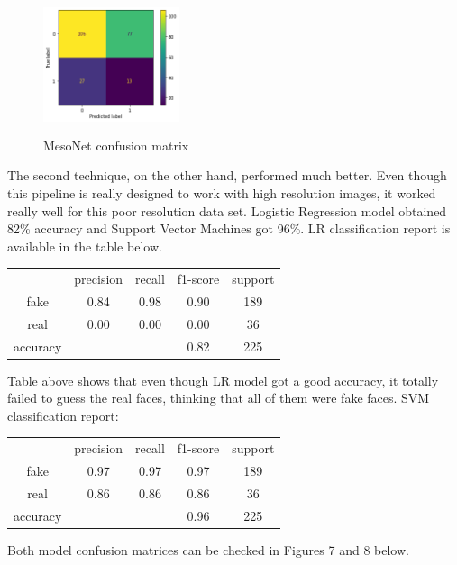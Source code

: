 \documentclass{bmvc2k}
\begin{document}
\begin{figure}[!h]
\centering
\includegraphics[width=4cm, height=4cm]{Figs/mesoNet-confusion-matrix.png}
    \caption{MesoNet confusion matrix}
\end{figure}

The second technique, on the other hand, performed much better. Even though this pipeline is really designed to work with high resolution images, it worked really well for this poor resolution data set. Logistic Regression model obtained 82\% accuracy and Support Vector Machines got 96\%. LR classification report is available in the table below. 

\begin{center}
\begin{tabular}{ c c c c c }
  & precision & recall & f1-score & support \\
 fake & 0.84 & 0.98 & 0.90 & 189 \\ 
 real &  0.00 & 0.00 & 0.00 & 36 \\
 accuracy &  &  & 0.82 & 225
\end{tabular}
\end{center}


\vspace{0.6cm} Table above shows that even though LR model got a good accuracy, it totally failed to guess the real faces, thinking that all of them were fake faces. SVM classification report:

\begin{center}
\begin{tabular}{ c c c c c }
  & precision & recall & f1-score & support \\
 fake & 0.97 & 0.97 & 0.97 & 189 \\ 
 real &  0.86 & 0.86 & 0.86 & 36 \\
 accuracy &  &  & 0.96 & 225
\end{tabular}
\end{center}

Both model confusion matrices can be checked in Figures 7 and 8 below.
\end{document}
